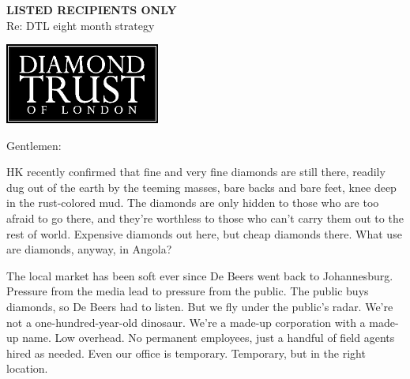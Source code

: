 \documentclass[12pt]{letter}
\begin{document}
\begin{letter}{{\bf LISTED RECIPIENTS ONLY}\\ \vspace{0.25in} Re: DTL eight month strategy}

\vspace*{-1.15in}
\begin{center}
\includegraphics[width=2in]{../logo_withFonts.eps}
\end{center}

\vspace*{-1.25in}

\address{
14 Greville St\\
Suite 77\\
London\\
EC1N 8BQ\\
UK\\
\\
+44 (0)20 7327 3080}

\date{May 2, 2000}

\signature{Jason Rohrer\\Acting President\\Diamond Trust of London}


\opening{Gentlemen:}

HK recently confirmed that fine and very fine diamonds are still there, readily dug out of the earth by the teeming masses, bare backs and bare feet, knee deep in the rust-colored mud.  The diamonds are only hidden to those who are too afraid to go there, and they're worthless to those who can't carry them out to the rest of world.  Expensive diamonds out here, but cheap diamonds there.  What use are diamonds, anyway, in Angola?

The local market has been soft ever since De Beers went back to Johannesburg.   Pressure from the media lead to pressure from the public.  The public buys diamonds, so De Beers had to listen.  But we fly under the public's radar.  We're not a one-hundred-year-old dinosaur.  We're a made-up corporation with a made-up name.  Low overhead.  No permanent employees, just a handful of field agents hired as needed.  Even our office is temporary.  Temporary, but in the right location.  %


\end{letter}
\end{document}
